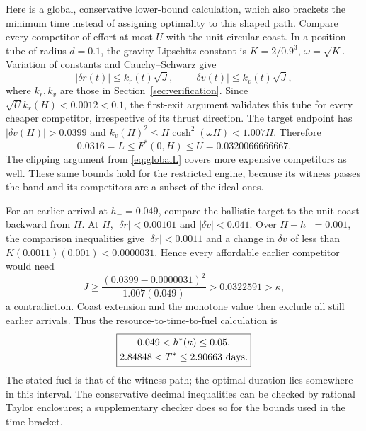 Here is a global, conservative lower-bound calculation, which also
brackets the minimum time instead of assigning optimality to this shaped
path. Compare every competitor of effort at most $U$ with the unit
circular coast. In a position tube of radius $d=0.1$, the gravity
Lipschitz constant is $K=2/0.9^3$, $\omega=\sqrt K$.
Variation of constants and Cauchy--Schwarz give
\begin{equation}
 |\delta r(t)|\le k_r(t)\sqrt J,\qquad
 |\delta v(t)|\le k_v(t)\sqrt J,
\end{equation}
where $k_r,k_v$ are those in Section~\ref{sec:verification}. Since
$\sqrt U k_r(H)<0.0012<0.1$, the first-exit argument validates this tube
for every cheaper competitor, irrespective of its thrust direction.
The target endpoint has $|\delta v(H)|>0.0399$ and
$k_v(H)^2\le H\cosh^2(\omega H)<1.007H$. Therefore
\begin{equation}
 0.0316=L\le F^*(0,H)\le U=0.0320066666667.
\end{equation}
The clipping argument from \eqref{eq:globalL} covers more expensive
competitors as well. These same bounds hold for the restricted engine,
because its witness passes the band and its competitors are a subset of
the ideal ones.

For an earlier arrival at $h_-=0.049$, compare the ballistic target to
the unit coast backward from $H$. At $H$, $|\delta r|<0.00101$ and
$|\delta v|<0.041$. Over $H-h_-=0.001$, the comparison inequalities
give $|\delta r|<0.0011$ and a change in $\delta v$ of less than
$K(0.0011)(0.001)<0.0000031$. Hence every affordable earlier competitor
would need
\begin{equation}
 J\ge\frac{(0.0399-0.0000031)^2}{1.007(0.049)}
   >0.0322591>\kappa,
\end{equation}
a contradiction. Coast extension and the monotone value then exclude
all still earlier arrivals. Thus the resource-to-time-to-fuel calculation is
\begin{equation}
 \boxed{\begin{gathered}0.049<h^*(\kappa)\le0.05,\\
 2.84848<T^*\le2.90663\ {\rm days}.\end{gathered}}
\end{equation}
The stated fuel is that of the witness path; the optimal duration lies
somewhere in this interval. The conservative decimal
inequalities can be checked by rational Taylor enclosures; a supplementary
checker does so for the bounds used in the time bracket.


